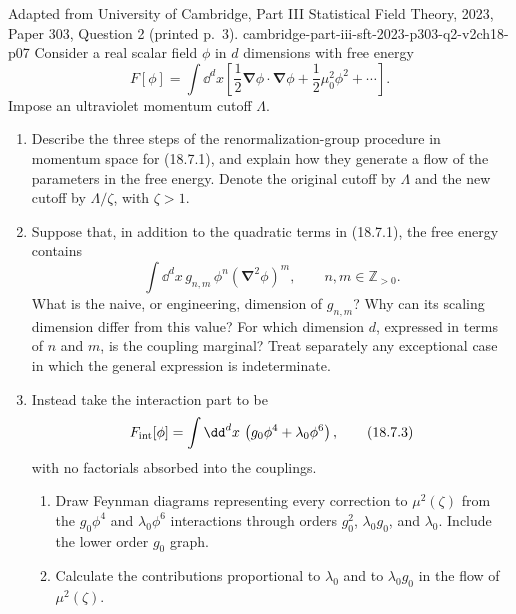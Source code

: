 \begin{enumerate}
  {Adapted from University of Cambridge, Part III Statistical Field Theory,
  2023, Paper 303, Question 2 (printed p.~3).}
  {cambridge-part-iii-sft-2023-p303-q2-v2ch18-p07}
  Consider a real scalar field \(\phi\) in \(d\) dimensions with free
  energy
  \[
    F[\phi]=\int \dd^dx\left[
      \frac12\boldsymbol\nabla\phi\mathbin{\cdot}\boldsymbol\nabla\phi
      +\frac12\mu_0^2\phi^2+\cdots\right].
    \tag{18.7.1}
  \]
  Impose an ultraviolet momentum cutoff \(\Lambda\).
  \begin{enumerate}
    \item[(a)]
    Describe the three steps of the renormalization-group procedure in
    momentum space for (18.7.1), and explain how they generate a flow of
    the parameters in the free energy.  Denote the original cutoff by
    \(\Lambda\) and the new cutoff by \(\Lambda/\zeta\), with
    \(\zeta>1\).

    \item[(b)]
    Suppose that, in addition to the quadratic terms in (18.7.1), the free
    energy contains
    \[
      \int \dd^dx\,
        g_{n,m}\,\phi^n(\boldsymbol\nabla^2\phi)^m,
      \qquad n,m\in\mathbb Z_{>0}.
      \tag{18.7.2}
    \]
    What is the naive, or engineering, dimension of \(g_{n,m}\)?  Why
    can its scaling dimension differ from this value?  For which
    dimension \(d\), expressed in terms of \(n\) and \(m\), is the
    coupling marginal?  Treat separately any exceptional case in which
    the general expression is indeterminate.

    \item[(c)]
    Instead take the interaction part to be
    \[
      F_{\rm int}[\phi]=\int \dd^dx\,
        \left(g_0\phi^4+\lambda_0\phi^6\right),
      \tag{18.7.3}
    \]
    with no factorials absorbed into the couplings.
    \begin{enumerate}
      \item[(i)]
      Draw Feynman diagrams representing every correction to
      \(\mu^2(\zeta)\) from the \(g_0\phi^4\) and
      \(\lambda_0\phi^6\) interactions through orders
      \(g_0^2\), \(\lambda_0g_0\), and \(\lambda_0\).  Include the
      lower order \(g_0\) graph.

      \item[(ii)]
      Calculate the contributions proportional to \(\lambda_0\) and to
      \(\lambda_0g_0\) in the flow of \(\mu^2(\zeta)\).


\end{enumerate}
\end{enumerate}
\end{enumerate}
